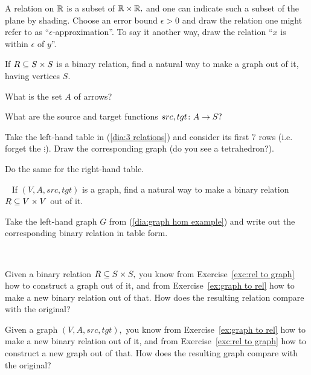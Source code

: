 \documentclass[../main/CT4S-EN-RU]{subfiles}
\begin{document}
\begin{exerciseENG}
A relation on $\RR$ is a subset of $\RR\times\RR,$ and one can indicate such a subset of the plane by shading. Choose an error bound $\epsilon>0$ and draw the relation one might refer to as “$\epsilon$-approximation”. To say it another way, draw the relation “$x$ is within $\epsilon$ of $y$”.
\end{exerciseENG}

\begin{exerciseRUS}
\end{exerciseRUS}

\begin{exerciseENG}\label{exc:rel to graph}
\sexc If $R\ss S\times S$ is a binary relation, find a natural way to make a graph out of it, having vertices $S.$ 
\item What is the set $A$ of arrows? 
\item What are the source and target functions $src,tgt\taking A\to S?$
\item Take the left-hand table in (\ref{dia:3 relations}) and consider its first $7$ rows (i.e. forget the $\vdots$). Draw the corresponding graph (do you see a tetrahedron?). 
\item Do the same for the right-hand table.
\endsexc
\end{exerciseENG}

\begin{exerciseRUS}\label{exc:rel to graph}
\end{exerciseRUS}

\begin{exerciseENG}\label{ex:graph to rel}~
\sexc If $(V,A,src,tgt)$ is a graph, find a natural way to make a binary relation $R\ss V\times V$ out of it. 
\item Take the left-hand graph $G$ from (\ref{dia:graph hom example}) and write out the corresponding binary relation in table form.
\endsexc
\end{exerciseENG}

\begin{exerciseRUS}\label{ex:graph to rel}~
\end{exerciseRUS}

\begin{exerciseENG}
\sexc Given a binary relation $R\ss S\times S,$ you know from Exercise~\ref{exc:rel to graph} how to construct a graph out of it, and from Exercise~\ref{ex:graph to rel} how to make a new binary relation out of that. How does the resulting relation compare with the original?
\item Given a graph $(V,A,src,tgt),$ you know from Exercise~\ref{ex:graph to rel} how to make a new binary relation out of it, and from Exercise~\ref{exc:rel to graph} how to construct a new graph out of that. How does the resulting graph compare with the original? 
\endsexc
\end{exerciseENG}

\begin{exerciseRUS}
\end{exerciseRUS}
\end{document}
